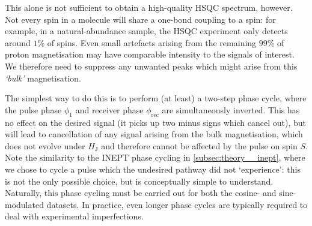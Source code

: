 This alone is not sufficient to obtain a high-quality HSQC spectrum, however.
Not every \proton{} spin in a molecule will share a one-bond coupling to a \carbon{} spin:  for example, in a natural-abundance sample, the HSQC experiment only detects around $1\%$ of \proton{} spins.
Even small artefacts arising from the remaining $99\%$ of proton magnetisation may have comparable intensity to the signals of interest.
We therefore need to suppress any unwanted peaks which might arise from this \textit{`bulk'} magnetisation.

The simplest way to do this is to perform (at least) a two-step phase cycle, where the pulse phase $\phi_1$ and receiver phase $\phi_\text{rec}$ are simultaneously inverted.
This has no effect on the desired signal (it picks up two minus signs which cancel out), but will lead to cancellation of any signal arising from the bulk magnetisation, which does not evolve under $H_\text{J}$ and therefore cannot be affected by the pulse on spin $S$.
Note the similarity to the INEPT phase cycling in \cref{subsec:theory__inept}, where we chose to cycle a pulse which the undesired pathway did not `experience': this is not the only possible choice, but is conceptually simple to understand.
Naturally, this phase cycling must be carried out for both the cosine- and sine-modulated datasets.
In practice, even longer phase cycles are typically required to deal with experimental imperfections.
